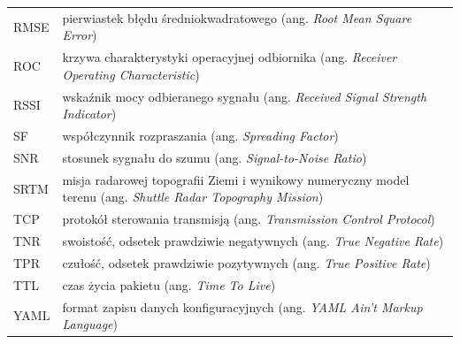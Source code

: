 \begin{longtable}{@{}p{1.8cm}p{13.2cm}@{}}
RMSE & pierwiastek błędu średniokwadratowego (ang. \textit{Root Mean Square Error}) \\
ROC & krzywa charakterystyki operacyjnej odbiornika (ang. \textit{Receiver Operating Characteristic}) \\
RSSI & wskaźnik mocy odbieranego sygnału (ang. \textit{Received Signal Strength Indicator}) \\
SF & współczynnik rozpraszania (ang. \textit{Spreading Factor}) \\
SNR & stosunek sygnału do szumu (ang. \textit{Signal-to-Noise Ratio}) \\
SRTM & misja radarowej topografii Ziemi i wynikowy numeryczny model terenu (ang. \textit{Shuttle Radar Topography Mission}) \\
TCP & protokół sterowania transmisją (ang. \textit{Transmission Control Protocol}) \\
TNR & swoistość, odsetek prawdziwie negatywnych (ang. \textit{True Negative Rate}) \\
TPR & czułość, odsetek prawdziwie pozytywnych (ang. \textit{True Positive Rate}) \\
TTL & czas życia pakietu (ang. \textit{Time To Live}) \\
YAML & format zapisu danych konfiguracyjnych (ang. \textit{YAML Ain't Markup Language}) \\
\end{longtable}
